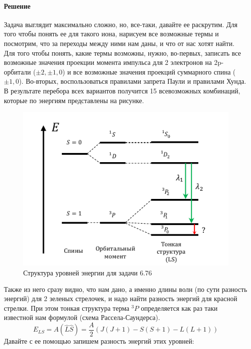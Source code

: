 \documentclass[12pt]{article}
\begin{document}
\paragraph{Решение}
Задача выглядит максимально сложно, но, все-таки, давайте ее раскрутим. Для того чтобы понять ее для такого иона, нарисуем все возможные термы и посмотрим, что за переходы между ними нам даны, и что от нас хотят найти. Для того чтобы понять, какие термы возможны, нужно, во-первых, записать все возможные значения проекции момента импульса для 2 электронов на 2p-орбитали ($\pm 2, \pm 1, 0$) и все возможные значения проекций суммарного спина ($\pm 1, 0$). Во-вторых, воспользоваться правилами запрета Паули и правилами Хунда. В результате перебора всех вариантов получится 15 всевозможных комбинаций, которые по энергиям представлены на рисунке. 
\begin{figure}[h]
    \centering
    \includegraphics[width=\textwidth,height=\textheight,keepaspectratio]{Seminar_07/pics/pic_04.pdf}
    \caption{Структура уровней энергии для задачи 6.76}
    \label{fig:sem_7_energy_levels}
\end{figure}
Также из него сразу видно, что нам дано, а именно длины волн (по сути разность энергий) для 2 зеленых стрелочек, и надо найти разность энергий для красной стрелки. При этом тонкая структура терма $^3P$ определяется как раз таки известной нам формулой (схема Рассела-Саундерса).
\begin{equation*}
    E_{LS} = A(\hat{L}\hat{S} ) = \dfrac{A}{2}\left(J(J+1) - S(S+1) -L(L+1) \right)
\end{equation*}
Давайте с ее помощью запишем разность энергий этих уровней:
\end{document}
